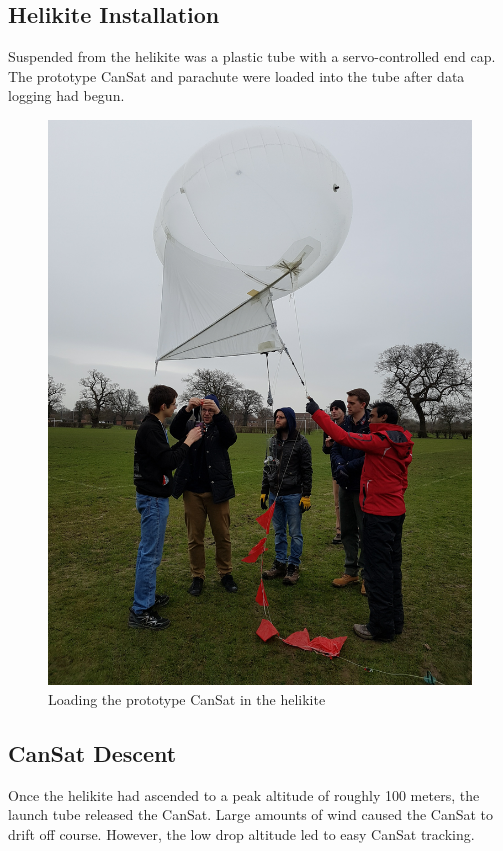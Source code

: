 \documentclass[]{report}
\begin{document}
	\subsection{Helikite Installation}
	Suspended from the helikite was a plastic tube with a servo-controlled end cap. The prototype CanSat and parachute were loaded into the tube after data logging had begun.
	\begin{figure}[h]
		\hfill\includegraphics[scale=0.13, angle=270]{helikite.jpg}\hspace*{\fill}
		\caption{Loading the prototype CanSat in the helikite}
		\label{hkite}
	\end{figure}
	
	
	\subsection{CanSat Descent}
	Once the helikite had ascended to a peak altitude of roughly 100 meters, the launch tube released the CanSat. Large amounts of wind caused the CanSat to drift off course. However, the low drop altitude led to easy CanSat tracking.
	
\end{document}
